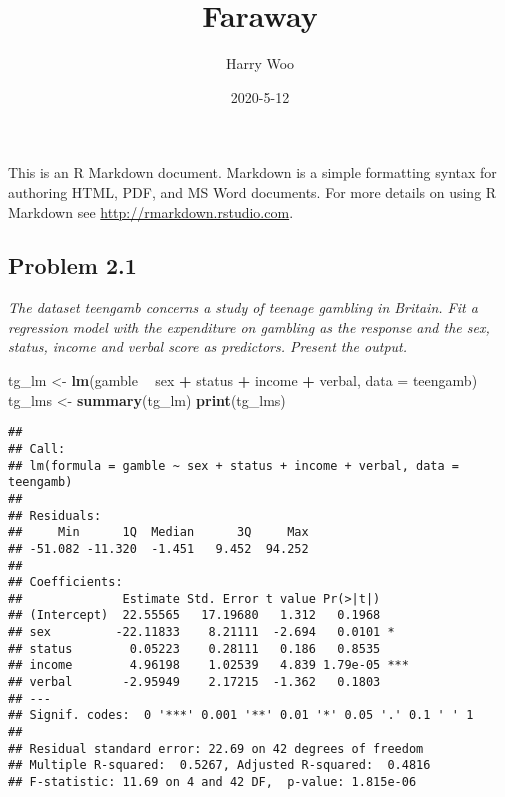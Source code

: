 \documentclass[
]{article}
\title{Faraway}
\author{Harry Woo}
\date{2020-5-12}
\newenvironment{Shaded}{\begin{snugshade}}{\end{snugshade}}
\newcommand{\DataTypeTok}[1]{\textcolor[rgb]{0.13,0.29,0.53}{#1}}
\newcommand{\KeywordTok}[1]{\textcolor[rgb]{0.13,0.29,0.53}{\textbf{#1}}}
\newcommand{\NormalTok}[1]{#1}
\newcommand{\OperatorTok}[1]{\textcolor[rgb]{0.81,0.36,0.00}{\textbf{#1}}}
\newcommand{\StringTok}[1]{\textcolor[rgb]{0.31,0.60,0.02}{#1}}
\begin{document}
\maketitle

This is an R Markdown document. Markdown is a simple formatting syntax
for authoring HTML, PDF, and MS Word documents. For more details on
using R Markdown see \url{http://rmarkdown.rstudio.com}.

\hypertarget{problem-2.1}{%
\subsection{Problem 2.1}\label{problem-2.1}}

\emph{The dataset teengamb concerns a study of teenage gambling in
Britain. Fit a regression model with the expenditure on gambling as the
response and the sex, status, income and verbal score as predictors.
Present the output.}

\begin{Shaded}
\begin{Highlighting}[]
\NormalTok{tg_lm <-}\StringTok{  }\KeywordTok{lm}\NormalTok{(gamble }\OperatorTok{~}\StringTok{ }\NormalTok{sex }\OperatorTok{+}\StringTok{ }\NormalTok{status }\OperatorTok{+}\StringTok{ }\NormalTok{income }\OperatorTok{+}\StringTok{ }\NormalTok{verbal, }\DataTypeTok{data =}\NormalTok{ teengamb)}
\NormalTok{tg_lms <-}\StringTok{ }\KeywordTok{summary}\NormalTok{(tg_lm)}
\KeywordTok{print}\NormalTok{(tg_lms)}
\end{Highlighting}
\end{Shaded}

\begin{verbatim}
## 
## Call:
## lm(formula = gamble ~ sex + status + income + verbal, data = teengamb)
## 
## Residuals:
##     Min      1Q  Median      3Q     Max 
## -51.082 -11.320  -1.451   9.452  94.252 
## 
## Coefficients:
##              Estimate Std. Error t value Pr(>|t|)    
## (Intercept)  22.55565   17.19680   1.312   0.1968    
## sex         -22.11833    8.21111  -2.694   0.0101 *  
## status        0.05223    0.28111   0.186   0.8535    
## income        4.96198    1.02539   4.839 1.79e-05 ***
## verbal       -2.95949    2.17215  -1.362   0.1803    
## ---
## Signif. codes:  0 '***' 0.001 '**' 0.01 '*' 0.05 '.' 0.1 ' ' 1
## 
## Residual standard error: 22.69 on 42 degrees of freedom
## Multiple R-squared:  0.5267, Adjusted R-squared:  0.4816 
## F-statistic: 11.69 on 4 and 42 DF,  p-value: 1.815e-06
\end{verbatim}
\end{document}
